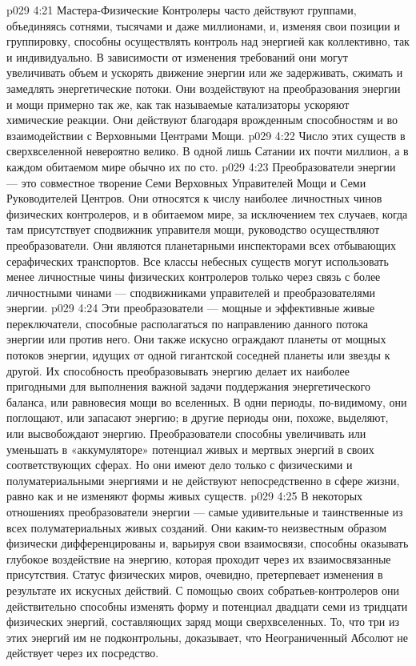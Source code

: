 \vs p029 4:21 Мастера\hyp{}Физические Контролеры часто действуют группами, объединяясь сотнями, тысячами и даже миллионами, и, изменяя свои позиции и группировку, способны осуществлять контроль над энергией как коллективно, так и индивидуально. В зависимости от изменения требований они могут увеличивать объем и ускорять движение энергии или же задерживать, сжимать и замедлять энергетические потоки. Они воздействуют на преобразования энергии и мощи примерно так же, как так называемые катализаторы ускоряют химические реакции. Они действуют благодаря врожденным способностям и во взаимодействии с Верховными Центрами Мощи.
\vs p029 4:22 \pc {}\bibnobreakspace {} Число этих существ в сверхвселенной невероятно велико. В одной лишь Сатании их почти миллион, а в каждом обитаемом мире обычно их по сто.
\vs p029 4:23 Преобразователи энергии --- это совместное творение Семи Верховных Управителей Мощи и Семи Руководителей Центров. Они относятся к числу наиболее личностных чинов физических контролеров, и в обитаемом мире, за исключением тех случаев, когда там присутствует сподвижник управителя мощи, руководство осуществляют преобразователи. Они являются планетарными инспекторами всех отбывающих серафических транспортов. Все классы небесных существ могут использовать менее личностные чины физических контролеров только через связь с более личностными чинами --- сподвижниками управителей и преобразователями энергии.
\vs p029 4:24 Эти преобразователи --- мощные и эффективные живые переключатели, способные располагаться по направлению данного потока энергии или против него. Они также искусно ограждают планеты от мощных потоков энергии, идущих от одной гигантской соседней планеты или звезды к другой. Их способность преобразовывать энергию делает их наиболее пригодными для выполнения важной задачи поддержания энергетического баланса, или равновесия мощи во вселенных. В одни периоды, по\hyp{}видимому, они поглощают, или запасают энергию; в другие периоды они, похоже, выделяют, или высвобождают энергию. Преобразователи способны увеличивать или уменьшать в «аккумуляторе» потенциал живых и мертвых энергий в своих соответствующих сферах. Но они имеют дело только с физическими и полуматериальными энергиями и не действуют непосредственно в сфере жизни, равно как и не изменяют формы живых существ.
\vs p029 4:25 В некоторых отношениях преобразователи энергии --- самые удивительные и таинственные из всех полуматериальных живых созданий. Они каким\hyp{}то неизвестным образом физически дифференцированы и, варьируя свои взаимосвязи, способны оказывать глубокое воздействие на энергию, которая проходит через их взаимосвязанные присутствия. Статус физических миров, очевидно, претерпевает изменения в результате их искусных действий.  С помощью своих собратьев\hyp{}контролеров они действительно способны изменять форму и потенциал двадцати семи из тридцати физических энергий, составляющих заряд мощи сверхвселенных. То, что три из этих энергий им не подконтрольны, доказывает, что Неограниченный Абсолют не действует через их посредство.
